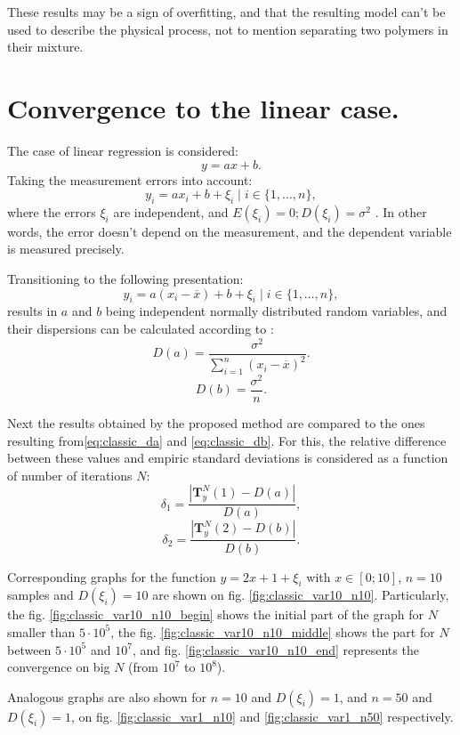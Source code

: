 \documentclass[11pt,a4paper]{article}
\theoremstyle{definition}
\begin{document}
These results may be a sign of overfitting, and that the resulting model can't be used to
describe the physical process, not to mention separating two polymers in their mixture.

\section{Convergence to the linear case.}

The case of linear regression is considered:
\[
  y = ax + b.
\]
Taking the measurement errors into account:
\[
  y_i = ax_i + b + \xi_i \mid i \in \{ 1, \dots, n \},
\]
where the errors $\xi_i$ are independent, and $E(\xi_i) = 0; D(\xi_i) = \sigma^2$ \cite{Vatunin05}.
In other words, the error doesn't depend on the measurement, and the dependent variable
is measured precisely.

Transitioning to the following presentation:
\[
  y_i = a(x_i - \overline{x}) + b + \xi_i \mid i \in \{ 1, \dots, n \},
\]
results in $a$ and $b$ being independent normally distributed random variables, and
their dispersions can be calculated according to \cite{Vatunin05}:
\begin{equation}
  \label{eq:classic_da}
  D(a) = \frac{\sigma^2}{\sum_{i = 1}^n (x_i - \overline{x})^2}.
\end{equation}
\begin{equation}
  \label{eq:classic_db}
  D(b) = \frac{\sigma^2}{n}.
\end{equation}

Next the results obtained by the proposed method are compared to the ones resulting
from\eqref{eq:classic_da} and \eqref{eq:classic_db}. For this, the relative difference
between these values and empiric standard deviations is considered as a function of
number of iterations $N$:
\[
  \delta_1 = \frac{| \mathbf{T}^N_y(1) - D(a) |}{D(a)},
\]
\[
  \delta_2 = \frac{| \mathbf{T}^N_y(2) - D(b) |}{D(b)}.
\]

Corresponding graphs for the function $y = 2x + 1 + \xi_i$ with $x \in [0; 10]$,
$n = 10$ samples and $D(\xi_i) = 10$ are shown on fig. \ref{fig:classic_var10_n10}.
Particularly, the fig. \ref{fig:classic_var10_n10_begin} shows the initial part of the
graph for $N$ smaller than $5 \cdot 10^5$, the fig. \ref{fig:classic_var10_n10_middle}
shows the part for $N$ between $5 \cdot 10^5$ and $10^7$, and fig.
\ref{fig:classic_var10_n10_end} represents the convergence on big $N$ (from $10^7$ to $10^8$).

Analogous graphs are also shown for $n = 10$ and $D(\xi_i) = 1$, and $n = 50$ and $D(\xi_i) = 1$,
on fig. \ref{fig:classic_var1_n10} and \ref{fig:classic_var1_n50} respectively.
\end{document}
